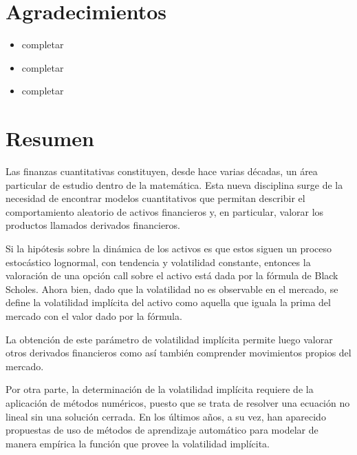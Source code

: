 \documentclass[a4paper,openright, 12pt, oneside]{book}
\begin{document}
\chapter*{Agradecimientos} %

\begin{itemize}
\item completar

\item completar

\item completar

\end{itemize}

\chapter*{\hspace{0.65cm}Resumen} %

Las finanzas cuantitativas constituyen, desde hace varias décadas, un área particular de estudio dentro de la matemática. Esta nueva disciplina surge de la necesidad de encontrar modelos cuantitativos que permitan describir el comportamiento aleatorio de activos financieros y, en particular, valorar los productos llamados derivados financieros.

Si la hipótesis sobre la dinámica de los activos es que estos siguen un proceso estocástico lognormal, con tendencia y volatilidad constante, entonces la valoración de una opción call sobre el activo está dada por la fórmula de Black Scholes. Ahora bien, dado que la volatilidad no es observable en el mercado, se define la volatilidad implícita del activo como aquella que iguala la prima del mercado con el valor dado por la fórmula.

La obtención de este parámetro de volatilidad implícita permite luego valorar otros derivados financieros como así también comprender movimientos propios del mercado.

\vspace{5mm}

Por otra parte, la determinación de la volatilidad implícita requiere de la aplicación de métodos numéricos, puesto que se trata de resolver una ecuación no lineal sin una solución cerrada. En los últimos años, a su vez, han aparecido propuestas de uso de métodos de aprendizaje automático para modelar de manera empírica la función que provee la volatilidad implícita.
\end{document}
